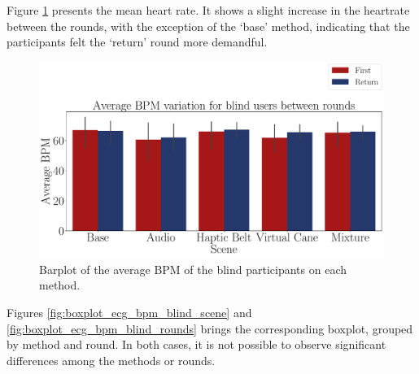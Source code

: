

Figure \ref{fig:barplot_ecg_bpm_5_scene_blind} presents the mean heart rate. It shows a slight increase in the heartrate between the rounds, with the exception of the ‘base’ method, indicating that the participants felt the ‘return’ round more demandful.

\begin{figure}[!htb]
    \centering
    \includegraphics[width = 0.8\linewidth]{Resultados/ECG/Figuras/pdf/barplot_ecg_bpm_5_scene_blind.pdf}
    \caption{Barplot of the average BPM of the blind participants on each method.}
    \label{fig:barplot_ecg_bpm_5_scene_blind}
\end{figure}

% 
%

Figures \ref{fig:boxplot_ecg_bpm_blind_scene} and \ref{fig:boxplot_ecg_bpm_blind_rounds} brings the corresponding boxplot, grouped by method and round. In both cases, it is not possible to observe significant differences among the methods or rounds.

